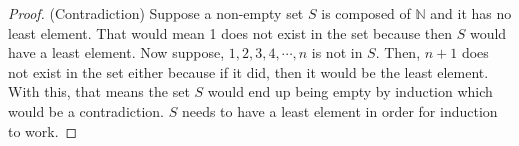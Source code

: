 \documentclass[11pt]{article}
\newcommand{\N}{\mathbb{N}}
\begin{document}
\begin{proof} 
	(Contradiction) Suppose a non-empty set $S$ is composed of $\N$ and it has no least element. That would mean 1 does not exist in the set because then $S$ would have a least element. Now suppose, $1, 2, 3, 4, \cdots, n$ is not in $S$. Then, $n+1$ does not exist in the set either because if it did, then it would be the least element. With this, that means the set $S$ would end up being empty by induction which would be a contradiction. $S$ needs to have a least element in order for induction to work. 
\end{proof}
\end{document}
